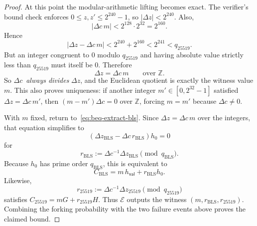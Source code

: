 \documentclass[11pt]{article}
\theoremstyle{definitionstyle}
\theoremstyle{plain}
\begin{document}
\begin{proof}
At this point the modular-arithmetic lifting becomes exact. The verifier's bound check enforces $0 \le z,z' \le 2^{240}-1$, so $|\Delta z| < 2^{240}$. Also,
\[
|\Delta c\, m| < 2^{128}\cdot 2^{32} = 2^{160}.
\]
Hence
\[
|\Delta z - \Delta c\, m| < 2^{240} + 2^{160} < 2^{241} < q_{25519}.
\]
But an integer congruent to $0$ modulo $q_{25519}$ and having absolute value strictly less than $q_{25519}$ must itself be $0$. Therefore
\[
\Delta z = \Delta c\, m \qquad \text{over } \mathbb{Z}.
\]
So $\Delta c$ \,\emph{always divides} $\Delta z$, and the Euclidean quotient is exactly the witness value $m$. This also proves uniqueness: if another integer $m' \in [0,2^{32}-1]$ satisfied $\Delta z = \Delta c\, m'$, then $(m-m')\Delta c = 0$ over $\mathbb{Z}$, forcing $m=m'$ because $\Delta c \neq 0$.

With $m$ fixed, return to~\eqref{eq:beq-extract-bls}. Since $\Delta z = \Delta c\, m$ over the integers, that equation simplifies to
\[
(\Delta z_{\text{BLS}} - \Delta c\, r_{\text{BLS}})h_0 = 0
\]
for
\[
r_{\text{BLS}} := \Delta c^{-1} \Delta z_{\text{BLS}} \pmod{q_{\text{BLS}}}.
\]
Because $h_0$ has prime order $q_{\text{BLS}}$, this is equivalent to
\[
C_{\text{BLS}} = m\, h_{\mathsf{val}} + r_{\text{BLS}} h_0.
\]
Likewise,
\[
r_{25519} := \Delta c^{-1} \Delta z_{25519} \pmod{q_{25519}}
\]
satisfies $C_{25519} = mG + r_{25519}H$. Thus $\mathcal{E}$ outputs the witness $(m,r_{\text{BLS}},r_{25519})$. Combining the forking probability with the two failure events above proves the claimed bound.
\end{proof}
\end{document}
